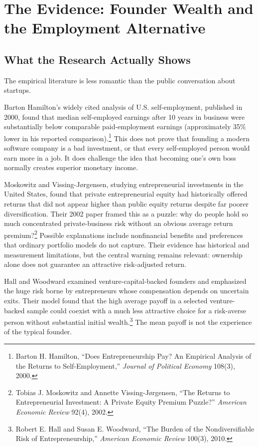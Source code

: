 \section{The Evidence: Founder Wealth and the Employment Alternative}

\subsection{What the Research Actually Shows}

The empirical literature is less romantic than the public conversation about startups.

Barton Hamilton's widely cited analysis of U.S. self-employment, published in 2000, found that median self-employed earnings after 10 years in business were substantially below comparable paid-employment earnings (approximately 35\% lower in his reported comparison).\footnote{Barton H. Hamilton, ``Does Entrepreneurship Pay? An Empirical Analysis of the Returns to Self-Employment,'' \textit{Journal of Political Economy} 108(3), 2000.} This does not prove that founding a modern software company is a bad investment, or that every self-employed person would earn more in a job. It does challenge the idea that becoming one's own boss normally creates superior monetary income.

Moskowitz and Vissing-Jørgensen, studying entrepreneurial investments in the United States, found that private entrepreneurial equity had historically offered returns that did not appear higher than public equity returns despite far poorer diversification. Their 2002 paper framed this as a puzzle: why do people hold so much concentrated private-business risk without an obvious average return premium?\footnote{Tobias J. Moskowitz and Annette Vissing-J\o{}rgensen, ``The Returns to Entrepreneurial Investment: A Private Equity Premium Puzzle?'' \textit{American Economic Review} 92(4), 2002.} Possible explanations include nonfinancial benefits and preferences that ordinary portfolio models do not capture. Their evidence has historical and measurement limitations, but the central warning remains relevant: ownership alone does not guarantee an attractive risk-adjusted return.

Hall and Woodward examined venture-capital-backed founders and emphasized the huge risk borne by entrepreneurs whose compensation depends on uncertain exits. Their model found that the high average payoff in a selected venture-backed sample could coexist with a much less attractive choice for a risk-averse person without substantial initial wealth.\footnote{Robert E. Hall and Susan E. Woodward, ``The Burden of the Nondiversifiable Risk of Entrepreneurship,'' \textit{American Economic Review} 100(3), 2010.} The mean payoff is not the experience of the typical founder.

